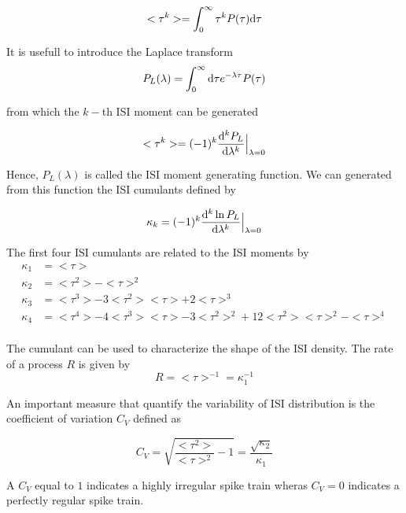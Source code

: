 \documentclass[a4paper,11pt,twoside]{article}
\def \dd  {{\rm d}}
\numberwithin{equation}{section}
\begin{document}
\begin{equation}
\label{eq:Pmoment}
<\tau^k>=\int_0^\infty \tau^kP(\tau)\dd\tau
\end{equation}


It is usefull to introduce the Laplace transform
\begin{equation}
\label{eq:Plaplace}
P_L(\lambda)=\int_0^\infty\dd\tau e^{-\lambda \tau}P(\tau)
\end{equation}

from which the  $k-$th ISI moment can be generated

\begin{equation}
\label{eq:Pmoment2}
<\tau^k>=(-1)^k\frac{\dd^k P_L}{\dd \lambda^k}\Bigr|_{\lambda=0}
\end{equation}

Hence, $P_L(\lambda)$ is called the ISI moment generating function. We can generated from this function the ISI cumulants defined by

\begin{equation}
\label{eq:Pcumulant}
\kappa_k=(-1)^k\frac{\dd^k \ln P_L}{\dd \lambda^k}\Bigr|_{\lambda=0}
\end{equation}

The first four ISI cumulants are related to the ISI moments by
\begin{align}
\label{eq:kappa1234}
\kappa_1&=<\tau>\\
\kappa_2&=<\tau^2>-<\tau>^2\\
\kappa_3&=<\tau^3> -3<\tau^2><\tau>+2<\tau>^3\\
\kappa_4&=<\tau^4>-4<\tau^3><\tau>-3<\tau^2>^2+12<\tau^2><\tau>^2-<\tau>^4\\
\end{align}

The cumulant can be used to characterize the shape of the ISI density. The rate of a process $R$ is given by
\begin{equation}
\label{eq:R}
R=<\tau>^{-1}=\kappa_1^{-1}
\end{equation}


An important measure that quantify the variability of ISI distribution is the coefficient of variation $C_V$ defined as


\begin{equation}
\label{eq:CV}
C_V=\sqrt{\frac{<\tau^2>}{<\tau>^2}-1}=\frac{\sqrt{\kappa_2}}{\kappa_1}
\end{equation}

A $C_V$ equal to $1$ indicates a highly irregular spike train wheras  $C_V=0$ indicates a perfectly regular spike train.
\end{document}
